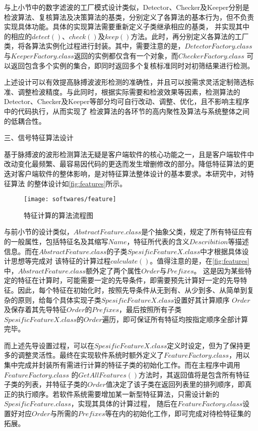 与上小节中的数字滤波的工厂模式设计类似，Detector、Checker及Keeper分别是检波算法、复核算法及决策算法的基类，分别定义了各算法的基本行为，但不负责实现具体功能。具体的实现算法需要重新定义子类继承相应的基类，
并实现其中的相应的$detect()$、$check()$及$keep()$方法。此时，再分别定义各算法的工厂类，将各算法实例化过程进行封装。其中，需要注意的是，$DetectorFactory.class$与$KeeperFactory.class$返回的实例都仅含有一个对象，而$CheckerFactory.class$
可以返回包含多个实例的集合，即同时返回多个复核标准同时对初筛结果进行检测。

上述设计可以有效提高脉搏波波形检测的准确性，并且可以按需求灵活定制筛选标准、调整检波精度。与此同时，根据实际需要和检波效果等因素，检测算法的Detector、Checker及Keeper等部分均可自行改动、调整、优化，且不影响主程序中的代码执行，从而实现了
检波算法的各环节的高内聚性及算法与系统整体之间的低耦合性。

三、信号特征算法设计

基于脉搏波的波形检测算法无疑是客户端软件的核心功能之一，且是客户端软件中改动变化最频繁、最容易因代码的更迭而发生增删修改的部分。降低特征算法的更迭对客户端软件的整体影响，是对特征算法整体设计的基本要求。本研究中，对特征算法
的整体设计如\autoref{fig:features}所示。
\begin{figure}[htbp]
    \centering
    \texttt{[image: softwares/feature]}
    \caption{\label{fig:features}特征计算的算法流程图}
\end{figure}

与前小节的设计类似，$AbstractFeature.class$是个抽象父类，规定了所有特征应有的一般属性，包括特征名及其缩写$Name$，特征所代表的含义$Describition$等描述信息。而在$AbstractFeature.class$的子类$SpesificFeatureX.class$中才根据具体设计思想等完成对
该特征的计算过程$calculate()$。值得注意的是，在\autoref{fig:features}中，$AbstractFeature.class$额外定了两个属性$Order$与$Prefixes$。
这是因为某些特定的特征在计算时，可能需要一定的先导条件，即需要预先计算好一定的先导特征。因此，每个特征在初始化时，按照先导条件从无到有、从少到多、从简单到复杂的原则，给每个具体实现子类$SpesificFeatureX.class$设置好其计算顺序
$Order$及保存着其先导特征$Order$的$Prefixes$，最后按照所有子类$SpesificFeatureX.class$的$Order$遍历，即可保证所有特征均按指定顺序全部计算完毕。

而上述先导设置过程，可以在$SpesificFeatureX.class$定义时设定，但为了保持更多的调整灵活性。最终在实现软件系统时额外定义了$FeatureFactory.class$，用以集中完成并封装所有需进行计算的特征子类的初始化工作。而在主程序中调用$FeatureFactory.class$
的$GetAllFeatures()$方法时，其返回值将是包含所有特征子类的列表，并特征子类的$Order$值决定了该子类在返回列表里的排列顺序，即真正的执行顺序。若软件系统需要增加某一新型特征算法，只需设计新的$SpesificFeature.class$，实现其具体的计算过程，
随后在$FeatureFactory.class$设置好对应$Order$与所需的$Prefixes$等在内的初始化工作，即可完成对待检特征集的拓展。

